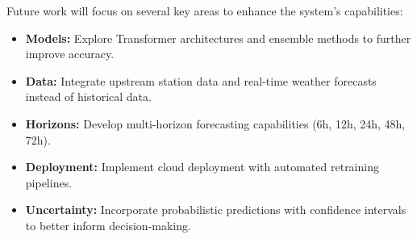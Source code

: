 Future work will focus on several key areas to enhance the system's capabilities:
\begin{itemize}
    \item \textbf{Models:} Explore Transformer architectures and ensemble methods to further improve accuracy.
    \item \textbf{Data:} Integrate upstream station data and real-time weather forecasts instead of historical data.
    \item \textbf{Horizons:} Develop multi-horizon forecasting capabilities (6h, 12h, 24h, 48h, 72h).
    \item \textbf{Deployment:} Implement cloud deployment with automated retraining pipelines.
    \item \textbf{Uncertainty:} Incorporate probabilistic predictions with confidence intervals to better inform decision-making.
\end{itemize}
